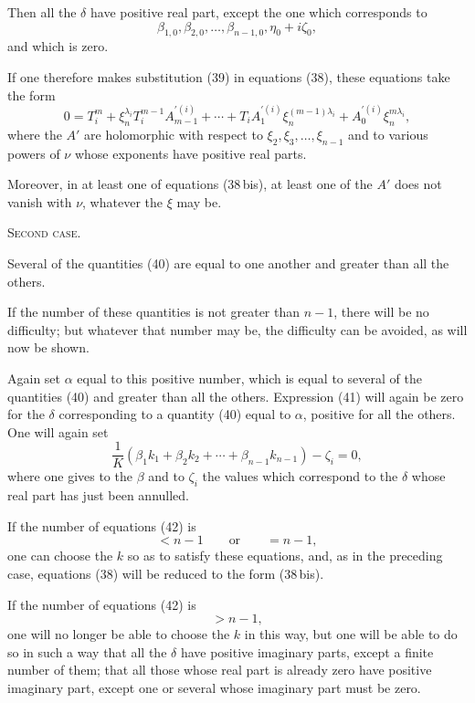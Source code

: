 \documentclass[11pt]{article}
\begin{document}
Then all the $\delta$ have positive real part, except the one which corresponds to
\[\beta_{1,0},\beta_{2,0},\ldots,\beta_{n-1,0},\eta_0+i\zeta_0,
\]
and which is zero.

If one therefore makes substitution (39) in equations (38), these equations take the form
\begin{equation*}\tag{38\,bis}
0=T_i^m+\xi_n^{\lambda_i}T_i^{m-1}A_{m-1}^{\prime(i)}+\cdots+T_iA_1^{\prime(i)}\xi_n^{(m-1)\lambda_i}+A_0^{\prime(i)}\xi_n^{m\lambda_i},
\end{equation*}
where the $A'$ are holomorphic with respect to $\xi_2,\xi_3,\ldots,\xi_{n-1}$ and to various powers of $\nu$ whose exponents have positive real parts.

Moreover, in at least one of equations (38\,bis), at least one of the $A'$ does not vanish with $\nu$, whatever the $\xi$ may be.

\begin{center}
{\scshape Second case.}
\end{center}

Several of the quantities (40) are equal to one another and greater than all the others.

If the number of these quantities is not greater than $n-1$, there will be no difficulty; but whatever that number may be, the difficulty can be avoided, as will now be shown.

Again set $\alpha$ equal to this positive number, which is equal to several of the quantities (40) and greater than all the others. Expression (41) will again be zero for the $\delta$ corresponding to a quantity (40) equal to $\alpha$, positive for all the others. One will again set
\begin{equation*}\tag{42}
\frac1K(\beta_1k_1+\beta_2k_2+\cdots+\beta_{n-1}k_{n-1})-\zeta_i=0,
\end{equation*}
where one gives to the $\beta$ and to $\zeta_i$ the values which correspond to the $\delta$ whose real part has just been annulled.

If the number of equations (42) is
\[
<n-1\qquad \text{or}\qquad =n-1,
\]
one can choose the $k$ so as to satisfy these equations, and, as in the preceding case, equations (38) will be reduced to the form (38\,bis).

If the number of equations (42) is
\[
>n-1,
\]
one will no longer be able to choose the $k$ in this way, but one will be able to do so in such a way that all the $\delta$ have positive imaginary parts, except a finite number of them; that all those whose real part is already zero have positive imaginary part, except one or several whose imaginary part must be zero.
\end{document}
